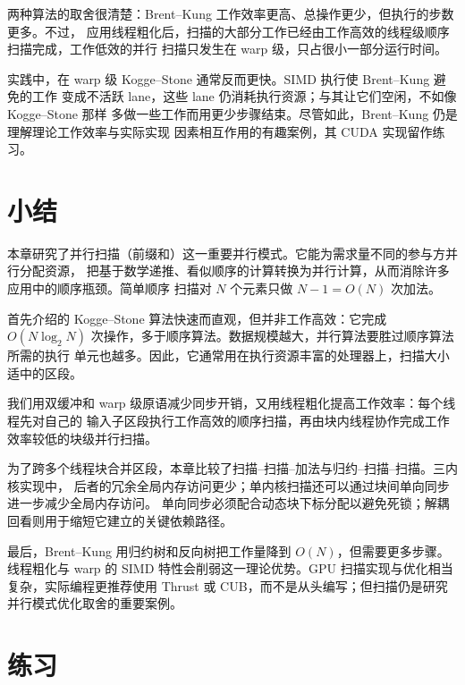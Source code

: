 两种算法的取舍很清楚：Brent--Kung 工作效率更高、总操作更少，但执行的步数更多。不过，
应用线程粗化后，扫描的大部分工作已经由工作高效的线程级顺序扫描完成，工作低效的并行
扫描只发生在 warp 级，只占很小一部分运行时间。

实践中，在 warp 级 Kogge--Stone 通常反而更快。SIMD 执行使 Brent--Kung 避免的工作
变成不活跃 lane，这些 lane 仍消耗执行资源；与其让它们空闲，不如像 Kogge--Stone 那样
多做一些工作而用更少步骤结束。尽管如此，Brent--Kung 仍是理解理论工作效率与实际实现
因素相互作用的有趣案例，其 CUDA 实现留作练习。

\section{小结}
\label{sec:scan-summary}

本章研究了并行扫描（前缀和）这一重要并行模式。它能为需求量不同的参与方并行分配资源，
把基于数学递推、看似顺序的计算转换为并行计算，从而消除许多应用中的顺序瓶颈。简单顺序
扫描对 $N$ 个元素只做 $N-1=O(N)$ 次加法。

首先介绍的 Kogge--Stone 算法快速而直观，但并非工作高效：它完成
$O(N\log_2N)$ 次操作，多于顺序算法。数据规模越大，并行算法要胜过顺序算法所需的执行
单元也越多。因此，它通常用在执行资源丰富的处理器上，扫描大小适中的区段。

我们用双缓冲和 warp 级原语减少同步开销，又用线程粗化提高工作效率：每个线程先对自己的
输入子区段执行工作高效的顺序扫描，再由块内线程协作完成工作效率较低的块级并行扫描。

为了跨多个线程块合并区段，本章比较了扫描--扫描--加法与归约--扫描--扫描。三内核实现中，
后者的冗余全局内存访问更少；单内核扫描还可以通过块间单向同步进一步减少全局内存访问。
单向同步必须配合动态块下标分配以避免死锁；解耦回看则用于缩短它建立的关键依赖路径。

最后，Brent--Kung 用归约树和反向树把工作量降到 $O(N)$，但需要更多步骤。线程粗化与
warp 的 SIMD 特性会削弱这一理论优势。GPU 扫描实现与优化相当复杂，实际编程更推荐使用
Thrust 或 CUB，而不是从头编写；但扫描仍是研究并行模式优化取舍的重要案例。

\section*{练习}


